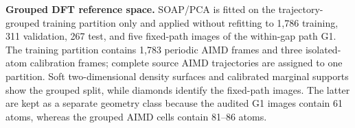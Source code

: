 \caption{\textbf{Grouped DFT reference space.} SOAP/PCA is fitted on the trajectory-grouped training partition only and applied without refitting to 1,786 training, 311 validation, 267 test, and five fixed-path images of the within-gap path G1. The training partition contains 1,783 periodic AIMD frames and three isolated-atom calibration frames; complete source AIMD trajectories are assigned to one partition. Soft two-dimensional density surfaces and calibrated marginal supports show the grouped split, while diamonds identify the fixed-path images. The latter are kept as a separate geometry class because the audited G1 images contain 61 atoms, whereas the grouped AIMD cells contain 81--86 atoms.}
\label{fig:task_conditioned_panel_a}
